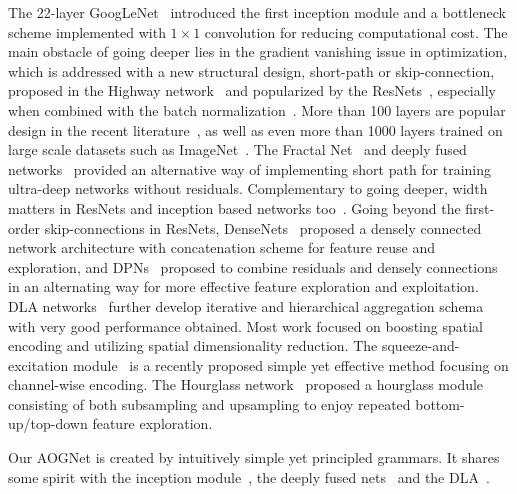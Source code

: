 \documentclass[10pt,twocolumn,letterpaper]{article}
\begin{document}
The  22-layer GoogLeNet~\cite{GoogLeNet} introduced the first inception module and a bottleneck scheme implemented with $1\times 1$ convolution for reducing computational cost. The main obstacle of going deeper lies in the gradient vanishing issue in optimization, which is addressed with a new structural design, short-path or skip-connection, proposed in the Highway network~\cite{HighwayNet} and popularized by the ResNets~\cite{ResidualNet}, especially when combined with the batch normalization~\cite{BatchNorm}. More than 100 layers are popular design in the recent literature~\cite{ResidualNet,InceptionNet}, as well as even more than 1000 layers trained on large scale datasets such as ImageNet~\cite{StochasticResNet,PolyNet}. The Fractal Net~\cite{FractalNet} and deeply fused networks~\cite{DFN} provided an alternative way of implementing short path for training ultra-deep networks without residuals. Complementary to going deeper, width matters in ResNets and inception based networks too~\cite{WideResNet,ResNeXt,IGC1}. Going beyond the first-order  skip-connections in ResNets, DenseNets~\cite{DenseNet} proposed a densely connected network architecture with concatenation scheme for feature reuse and exploration, and DPNs~\cite{DPN} proposed to combine residuals and densely connections in an alternating way for more effective feature exploration and exploitation. DLA networks~\cite{DLA} further develop iterative and hierarchical  aggregation schema with very good performance obtained.  
Most work focused on boosting spatial encoding and utilizing spatial dimensionality reduction. The squeeze-and-excitation module~\cite{SENet} is a recently proposed simple yet effective method focusing on channel-wise encoding. The Hourglass network~\cite{Hourglass} proposed a hourglass module consisting of both subsampling and upsampling to enjoy repeated bottom-up/top-down feature exploration.

Our AOGNet is created by intuitively simple yet principled grammars. It shares some spirit with the inception module~\cite{InceptionNet}, the deeply fused nets~\cite{DFN} and the DLA~\cite{DLA}. 
\end{document}
